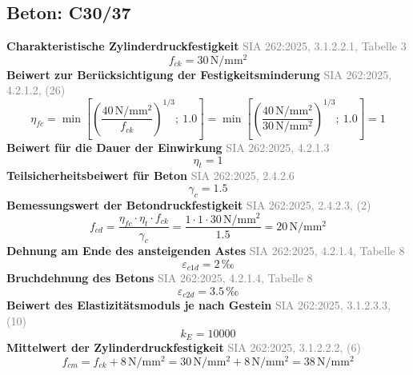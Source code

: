 \documentclass[11pt,a4paper]{article}
\newcommand{\normref}[1]{{\small\textcolor{gray}{#1}}}
\begin{document}
\subsection{Beton: C30/37}
\noindent\textbf{Charakteristische Zylinderdruckfestigkeit} \hfill \normref{SIA 262:2025, 3.1.2.2.1, Tabelle 3}
\begin{equation*}
f_{ck} = 30\,\mathrm{N}/\mathrm{mm}^{2}
\end{equation*}
\noindent\textbf{Beiwert zur Berücksichtigung der Festigkeitsminderung} \hfill \normref{SIA 262:2025, 4.2.1.2, (26)}
\begin{equation*}
\eta_{fc} = \min\left[\left(\frac{40\,\mathrm{N}/\mathrm{mm}^{2}}{f_{ck}}\right)^{1/3};\ 1.0\right] = \min\left[\left(\frac{40\,\mathrm{N}/\mathrm{mm}^{2}}{30\,\mathrm{N}/\mathrm{mm}^{2}}\right)^{1/3};\ 1.0\right] = 1
\end{equation*}
\noindent\textbf{Beiwert für die Dauer der Einwirkung} \hfill \normref{SIA 262:2025, 4.2.1.3}
\begin{equation*}
\eta_t = 1
\end{equation*}
\noindent\textbf{Teilsicherheitsbeiwert für Beton} \hfill \normref{SIA 262:2025, 2.4.2.6}
\begin{equation*}
\gamma_c = 1.5
\end{equation*}
\noindent\textbf{Bemessungswert der Betondruckfestigkeit} \hfill \normref{SIA 262:2025, 2.4.2.3, (2)}
\begin{equation*}
f_{cd} = \frac{\eta_{fc} \cdot \eta_t \cdot f_{ck}}{\gamma_c} = \frac{1 \cdot 1 \cdot 30\,\mathrm{N}/\mathrm{mm}^{2}}{1.5} = 20\,\mathrm{N}/\mathrm{mm}^{2}
\end{equation*}
\noindent\textbf{Dehnung am Ende des ansteigenden Astes} \hfill \normref{SIA 262:2025, 4.2.1.4, Tabelle 8}
\begin{equation*}
\varepsilon_{c1d} = 2\,\text{‰}
\end{equation*}
\noindent\textbf{Bruchdehnung des Betons} \hfill \normref{SIA 262:2025, 4.2.1.4, Tabelle 8}
\begin{equation*}
\varepsilon_{c2d} = 3.5\,\text{‰}
\end{equation*}
\noindent\textbf{Beiwert des Elastizitätsmoduls je nach Gestein} \hfill \normref{SIA 262:2025, 3.1.2.3.3, (10)}
\begin{equation*}
k_E = 10000
\end{equation*}
\noindent\textbf{Mittelwert der Zylinderdruckfestigkeit} \hfill \normref{SIA 262:2025, 3.1.2.2.2, (6)}
\begin{equation*}
f_{cm} = f_{ck} + 8\,\mathrm{N}/\mathrm{mm}^{2} = 30\,\mathrm{N}/\mathrm{mm}^{2} + 8\,\mathrm{N}/\mathrm{mm}^{2} = 38\,\mathrm{N}/\mathrm{mm}^{2}
\end{equation*}
\end{document}
